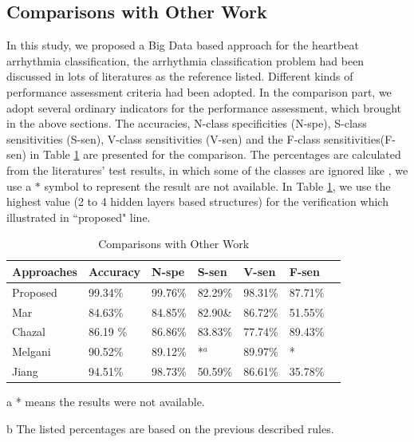 \documentclass[journal]{IEEEtran}
\begin{document}
\subsection{Comparisons with Other Work}
In this study, we proposed a Big Data based approach for the heartbeat arrhythmia classification, the arrhythmia classification problem had been discussed in lots of literatures as the reference listed. Different kinds of performance assessment criteria had been adopted. In the comparison part, we adopt several ordinary indicators for the performance assessment, which brought in the above sections. The accuracies, N-class specificities (N-spe), S-class sensitivities (S-sen), V-class sensitivities (V-sen) and the F-class sensitivities(F-sen) in Table \ref{table9} are presented for the comparison. The percentages are calculated from the literatures' test results, in which some of the classes are ignored like \cite{melgan}, we use a $*$ symbol to represent the result are not available. 
In Table \ref{table9}, we use the highest value (2 to 4 hidden layers based structures) for the verification which illustrated in ``proposed" line.

\begin{table}[!htbp]
\begin{center}
\begin{threeparttable}
\caption{Comparisons with Other Work}
\label{table9}
\begin{tabular}{lllllll}
\hline

Approaches&  Accuracy & N-spe & S-sen & V-sen & F-sen \\
\hline
 Proposed & 99.34\% & 99.76\% &  82.29\% & 98.31\% & 87.71\% \\
 Mar\cite{mar} & 84.63\% &84.85\% & 82.90\& & 86.72\% & 51.55\% \\
 Chazal\cite{chaza} &  86.19 \% & 86.86\% & 83.83\% & 77.74\% & 89.43\% \\
 Melgani\cite{melgan} & 90.52\% & 89.12\% & *$^a$& 89.97\% & * \\
 Jiang \cite{jiang} & 94.51\%  &98.73\% & 50.59\% & 86.61\% & 35.78\% \\
\hline
\end{tabular}
\begin{tablenotes}
\item [a] * means the results were not available.
\item [b] The listed percentages are based on the previous described rules.
\end{tablenotes}
\end{threeparttable}
\end{center}
\end{table}
\end{document}
